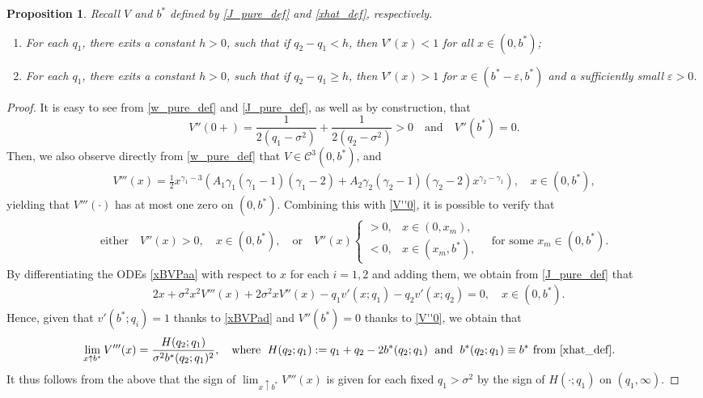 \documentclass[11pt]{article} %
\newtheorem{proposition}[theorem]{Proposition}
\numberwithin{komcounter}{section}
\renewcommand{\epsilon}{\varepsilon}
\begin{document}
\begin{proposition} \label{non_ex_equilibrum}
Recall $V$ and $b^*$ defined by \eqref{J_pure_def} and \eqref{xhat_def}, respectively. 
\begin{enumerate}[\rm (i)]
\item For each $q_1$, there exits a constant $h>0$, such that if 
$q_2-q_1 < h$, then $V'(x)<1$ for all $x\in(0,b^*)$; 
\item For each $q_1$, there exits a constant $h>0$, such that if 
$q_2-q_1 \geq h$, then $V'(x)>1$ for $x\in (b^*-\epsilon, b^*)$ and a sufficiently small $\epsilon>0$.
\end{enumerate}
\end{proposition}
\begin{proof}
It is easy to see from \eqref{w_pure_def} and \eqref{J_pure_def}, as well as by construction, that 
\begin{equation} \label{V''0}
V''(0+) = \frac{1}{2(q_1-\sigma^2)} + \frac{1}{2(q_2-\sigma^2)} > 0 
\quad \text{and} \quad V''(b^*) = 0.
\end{equation}
Then, we also observe directly from \eqref{w_pure_def} that $V \in \mathcal{C}^3(0,b^*)$, and 
\begin{align*}
V'''(x) = 
\tfrac{1}{2} x^{\gamma_1-3} \left( A_1\gamma_1(\gamma_1-1)(\gamma_1-2) + A_2\gamma_2(\gamma_2-1)(\gamma_2-2) x^{\gamma_2-\gamma_1}\right),  \quad x \in (0,b^*),
\end{align*}
yielding that $V'''(\cdot)$ has at most one zero on $(0,b^*)$. 
Combining this with \eqref{V''0}, it is possible to verify that
\begin{align} \label{V'''zeros}
\text{either} \quad 
V''(x)>0, \quad x \in (0,b^*), 
\quad \text{or} \quad 
V''(x) \begin{cases} > 0 , & x \in (0, x_m), \\
< 0 , & x \in (x_m,b^*),
\end{cases}
\quad \text{for some } x_m \in (0,b^*).
\end{align}
By differentiating the ODEs \eqref{xBVPaa} with respect to $x$ for each $i=1,2$ and adding them, we obtain from \eqref{J_pure_def} that 
\begin{align*}
&2x + \sigma^2 x^2 V'''(x) + 2 \sigma^2 x V''(x) - q_1 v'(x;q_1) - q_2 v'(x;q_2) = 0, \quad x \in (0,b^*).
\end{align*}
Hence, given that $v'(b^*;q_i) = 1$ thanks to \eqref{xBVPad} and $V''(b^*)=0$ thanks to \eqref{V''0}, we obtain that  
\begin{align} \label{V'''b}
&\lim_{x \uparrow b^*} V'''(x) 
= \frac{H(q_2;q_1)}{\sigma^2 b^*(q_2;q_1)^2},
\quad \text{where \;$H(q_2;q_1):=q_1 + q_2 - 2b^*(q_2;q_1)\;$ and $\;b^*(q_2;q_1) \equiv b^*$ from \eqref{xhat_def}.}
\end{align}
It thus follows from the above that the sign of $\lim_{x \uparrow b^*} V'''(x)$ is given for each fixed $q_1 > \sigma^2$ by the sign of $H(\cdot;q_1)$ on $(q_1,\infty)$.


\end{proof}
\end{document}
